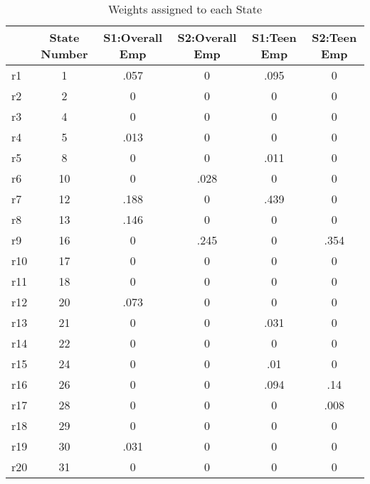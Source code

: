 \begin{table}[htbp]\centering
\caption{Weights assigned to each State}
\begin{tabular}{l*{5}{c}}
\toprule
            &State Number&S1:Overall Emp&S2:Overall Emp& S1:Teen Emp& S2:Teen Emp\\
\midrule
r1          &           1&        .057&           0&        .095&           0\\
r2          &           2&           0&           0&           0&           0\\
r3          &           4&           0&           0&           0&           0\\
r4          &           5&        .013&           0&           0&           0\\
r5          &           8&           0&           0&        .011&           0\\
r6          &          10&           0&        .028&           0&           0\\
r7          &          12&        .188&           0&        .439&           0\\
r8          &          13&        .146&           0&           0&           0\\
r9          &          16&           0&        .245&           0&        .354\\
r10         &          17&           0&           0&           0&           0\\
r11         &          18&           0&           0&           0&           0\\
r12         &          20&        .073&           0&           0&           0\\
r13         &          21&           0&           0&        .031&           0\\
r14         &          22&           0&           0&           0&           0\\
r15         &          24&           0&           0&         .01&           0\\
r16         &          26&           0&           0&        .094&         .14\\
r17         &          28&           0&           0&           0&        .008\\
r18         &          29&           0&           0&           0&           0\\
r19         &          30&        .031&           0&           0&           0\\
r20         &          31&           0&           0&           0&           0\\

\end{tabular}
\end{table}
